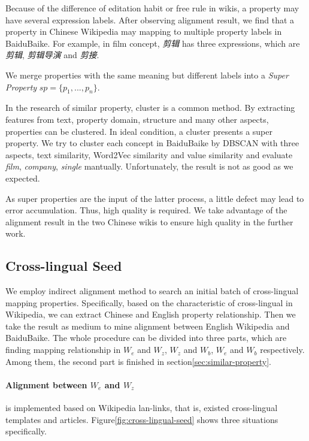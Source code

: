 \documentclass[runningheads,a4paper]{llncs}
\begin{document}
Because of the difference of editation habit or free rule in wikis, a property may have several expression labels. After observing alignment result, we find that a property in Chinese Wikipedia may mapping to multiple property labels in BaiduBaike. For example, in film concept, \textit{剪辑} has three expressions, which are \textit{剪辑}, \textit{剪辑导演} and \textit{剪接}.

We merge properties with the same meaning but different labels into a \textit{Super Property} $sp=\{p_1,...,p_n\}$.

In the research of similar property, cluster is a common method. By extracting features from text, property domain, structure and many other aspects, properties can be clustered. In ideal condition, a cluster presents a super property. We try to cluster each concept in BaiduBaike by DBSCAN with three aspects, text similarity, Word2Vec similarity and value similarity and evaluate \textit{film}, \textit{company}, \textit{single} mantually. Unfortunately, the result is not as good as we expected.

As super properties are the input of the latter process, a little defect may lead to error accumulation. Thus, high quality is required. We take advantage of the alignment result in the two Chinese wikis to ensure high quality in the further work.

\subsection{Cross-lingual Seed}
We employ indirect alignment method to search an initial batch of cross-lingual mapping properties. Specifically, based on the characteristic of cross-lingual in Wikipedia, we can extract Chinese and English property relationship. Then we take the result as medium to mine alignment between English Wikipedia and BaiduBaike. The whole procedure can be divided into three parts, which are finding mapping relationship in $W_e$ and $W_z$, $W_z$ and $W_b$, $W_e$ and $W_b$ respectively. Among them, the second part is finished in section\ref{sec:similar-property}.

\paragraph{Alignment between $W_e$ and $W_z$} is implemented based on Wikipedia lan-links, that is, existed cross-lingual templates and articles. Figure\ref{fig:cross-lingual-seed} shows three situations specifically.
\end{document}
